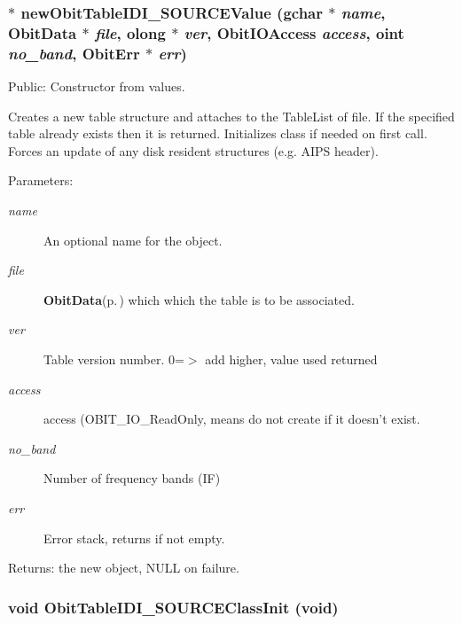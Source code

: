 \subsubsection{$\ast$ new\-Obit\-Table\-IDI\_\-SOURCEValue (gchar $\ast$ {\em name}, {\bf Obit\-Data} $\ast$ {\em file}, {\bf olong} $\ast$ {\em ver}, Obit\-IOAccess {\em access}, {\bf oint} {\em no\_\-band}, {\bf Obit\-Err} $\ast$ {\em err})}\label{ObitTableIDI__SOURCE_8c_a18}


Public: Constructor from values. 

Creates a new table structure and attaches to the Table\-List of file. If the specified table already exists then it is returned. Initializes class if needed on first call. Forces an update of any disk resident structures (e.g. AIPS header). \begin{Desc}
\item[Parameters:]
\begin{description}
\item[{\em name}]An optional name for the object. \item[{\em file}]{\bf Obit\-Data}{\rm (p.\,\pageref{structObitData})} which which the table is to be associated. \item[{\em ver}]Table version number. 0=$>$ add higher, value used returned \item[{\em access}]access (OBIT\_\-IO\_\-Read\-Only, means do not create if it doesn't exist. \item[{\em no\_\-band}]Number of frequency bands (IF) \item[{\em err}]Error stack, returns if not empty. \end{description}
\end{Desc}
\begin{Desc}
\item[Returns:]the new object, NULL on failure. \end{Desc}
\subsubsection{\setlength{\rightskip}{0pt plus 5cm}void Obit\-Table\-IDI\_\-SOURCEClass\-Init (void)}\label{ObitTableIDI__SOURCE_8c_a27}


